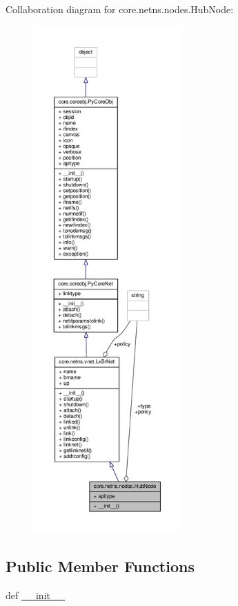 Collaboration diagram for core.\+netns.\+nodes.\+Hub\+Node\+:
\nopagebreak
\begin{figure}[H]
\begin{center}
\leavevmode
\includegraphics[height=550pt]{classcore_1_1netns_1_1nodes_1_1_hub_node__coll__graph}
\end{center}
\end{figure}
\subsection*{Public Member Functions}
\begin{DoxyCompactItemize}
\item 
def \hyperlink{classcore_1_1netns_1_1nodes_1_1_hub_node_adebe4abd9812bfad4447c864f86c560f}{\+\_\+\+\_\+init\+\_\+\+\_\+}
\end{DoxyCompactItemize}
